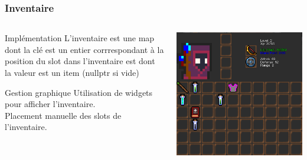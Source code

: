 \documentclass[french]{beamer}
\begin{document}
\begin{frame}
\frametitle{Inventaire}
\begin{columns}
    \begin{column}{0.34\textwidth}
    
        \begin{block}{Implémentation}
         L'inventaire est une map dont la clé est un entier corrrespondant à la position du slot dans l'inventaire est dont la valeur est un item (nullptr si vide)
        \end{block}
        \begin{block}{Gestion graphique}
            Utilisation de widgets pour afficher l'inventaire.\\
            Placement manuelle des slots de l'inventaire.\\
        \end{block}
        
    \end{column}
    \begin{column}{0.66\textwidth}
    
    \includegraphics[scale=0.25]{Inventaire}
    
    \end{column}
\end{columns}
\end{frame}
\end{document}
